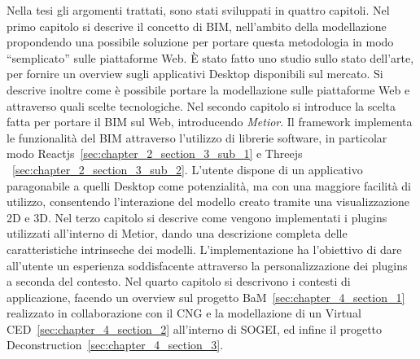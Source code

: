 Nella tesi gli argomenti trattati, sono stati sviluppati in quattro capitoli.
Nel primo capitolo si descrive il concetto di BIM, nell’ambito della modellazione propondendo una possibile soluzione
per portare questa metodologia in modo ``semplicato'' sulle piattaforme Web.
\`E stato fatto uno studio sullo stato dell’arte, per fornire un overview
sugli applicativi Desktop disponibili sul mercato. Si descrive inoltre come è
possibile portare la modellazione sulle piattaforme Web e attraverso quali scelte tecnologiche.
Nel secondo capitolo si introduce la scelta fatta per portare il BIM sul Web, introducendo \emph{Metior}.
Il framework implementa le funzionalità del BIM attraverso l'utilizzo di librerie software,
in particolar modo Reactjs~\ref{sec:chapter_2_section_3_sub_1} e Threejs ~\ref{sec:chapter_2_section_3_sub_2}.
L'utente dispone di un applicativo paragonabile a quelli
Desktop come potenzialità, ma con una maggiore facilità di utilizzo, consentendo l'interazione del modello creato
tramite una visualizzazione 2D e 3D.
Nel terzo capitolo si descrive come vengono implementati i plugins utilizzati all'interno di Metior,
dando una descrizione completa delle caratteristiche intrinseche dei modelli. L'implementazione ha l'obiettivo
di dare all'utente un esperienza soddisfacente attraverso la personalizzazione dei plugins a seconda del contesto.
Nel quarto capitolo si descrivono i contesti di applicazione, facendo un overview sul progetto BaM~\ref{sec:chapter_4_section_1}
realizzato in collaborazione con il CNG e la modellazione di un Virtual CED~\ref{sec:chapter_4_section_2} all'interno di SOGEI, ed
infine il progetto Deconstruction~\ref{sec:chapter_4_section_3}.
